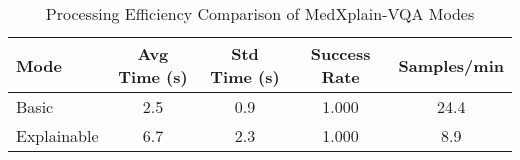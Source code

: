 
\begin{table}[htbp]
\centering
\caption{Processing Efficiency Comparison of MedXplain-VQA Modes}
\label{tab:efficiency_comparison}
\begin{tabular}{lcccc}
\toprule
\textbf{Mode} & \textbf{Avg Time (s)} & \textbf{Std Time (s)} & \textbf{Success Rate} & \textbf{Samples/min} \\
\midrule
Basic & 2.5 & 0.9 & 1.000 & 24.4 \\
Explainable & 6.7 & 2.3 & 1.000 & 8.9 \\
\bottomrule
\end{tabular}
\end{table}
